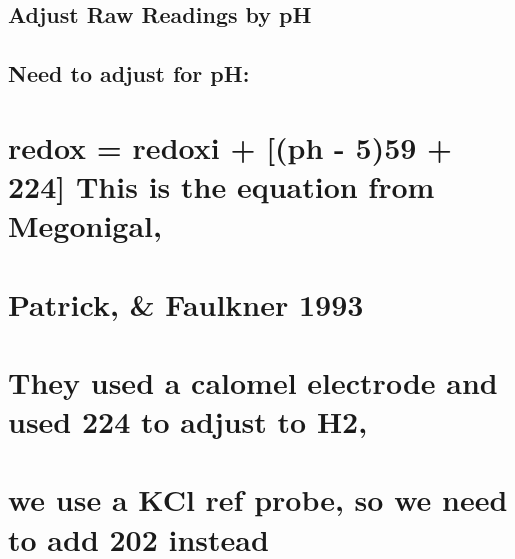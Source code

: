 \documentclass[
  letterpaper,
  DIV=11,
  numbers=noendperiod]{scrartcl}
\begin{document}
\subsection{Adjust Raw Readings by pH}\label{adjust-raw-readings-by-ph}

\subsection{Need to adjust for pH:}\label{need-to-adjust-for-ph}

\section{redox = redoxi + {[}(ph - 5)59 + 224{]} This is the equation
from
Megonigal,}\label{redox-redoxi-ph---559-224-this-is-the-equation-from-megonigal}

\section{Patrick, \& Faulkner 1993}\label{patrick-faulkner-1993}

\section{They used a calomel electrode and used 224 to adjust to
H2,}\label{they-used-a-calomel-electrode-and-used-224-to-adjust-to-h2}

\section{we use a KCl ref probe, so we need to add 202
instead}\label{we-use-a-kcl-ref-probe-so-we-need-to-add-202-instead}
\end{document}
